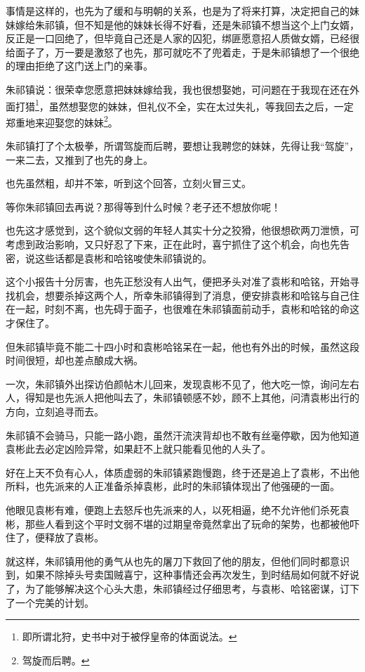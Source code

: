 \begin{multicols}{\theparacolNo}
事情是这样的，也先为了缓和与明朝的关系，也是为了将来打算，决定把自己的妹妹嫁给朱祁镇，但不知是他的妹妹长得不好看，还是朱祁镇不想当这个上门女婿，反正是一口回绝了，但毕竟自己还是人家的囚犯，绑匪愿意招人质做女婿，已经很给面子了，万一要是激怒了也先，那可就吃不了兜着走，于是朱祁镇想了一个很绝的理由拒绝了这门送上门的亲事。

朱祁镇说：很荣幸您愿意把妹妹嫁给我，我也很想娶她，可问题在于我现在还在外面打猎\footnote{即所谓北狩，史书中对于被俘皇帝的体面说法。}，虽然想娶您的妹妹，但礼仪不全，实在太过失礼，等我回去之后，一定郑重地来迎娶您的妹妹\footnote{驾旋而后聘。}。

朱祁镇打了个太极拳，所谓驾旋而后聘，要想让我聘您的妹妹，先得让我“驾旋”，一来二去，又推到了也先的身上。

也先虽然粗，却并不笨，听到这个回答，立刻火冒三丈。

等你朱祁镇回去再说？那得等到什么时候？老子还不想放你呢！

也先这才感觉到，这个貌似文弱的年轻人其实十分之狡猾，他很想砍两刀泄愤，可考虑到政治影响，又只好忍了下来，正在此时，喜宁抓住了这个机会，向也先告密，说这些话都是袁彬和哈铭唆使朱祁镇说的。

这个小报告十分厉害，也先正愁没有人出气，便把矛头对准了袁彬和哈铭，开始寻找机会，想要杀掉这两个人，所幸朱祁镇得到了消息，便安排袁彬和哈铭与自己住在一起，时刻不离，也先碍于面子，也很难在朱祁镇面前动手，袁彬和哈铭的命这才保住了。

但朱祁镇毕竟不能二十四小时和袁彬哈铭呆在一起，他也有外出的时候，虽然这段时间很短，却也差点酿成大祸。

一次，朱祁镇外出探访伯颜帖木儿回来，发现袁彬不见了，他大吃一惊，询问左右人，得知是也先派人把他叫去了，朱祁镇顿感不妙，顾不上其他，问清袁彬出行的方向，立刻追寻而去。

朱祁镇不会骑马，只能一路小跑，虽然汗流浃背却也不敢有丝毫停歇，因为他知道袁彬此去必定凶险异常，如果赶不上就只能看见他的人头了。

好在上天不负有心人，体质虚弱的朱祁镇紧跑慢跑，终于还是追上了袁彬，不出他所料，也先派来的人正准备杀掉袁彬，此时的朱祁镇体现出了他强硬的一面。

他眼见袁彬有难，便跑上去怒斥也先派来的人，以死相逼，绝不允许他们杀死袁彬，那些人看到这个平时文弱不堪的过期皇帝竟然拿出了玩命的架势，也都被他吓住了，便释放了袁彬。

就这样，朱祁镇用他的勇气从也先的屠刀下救回了他的朋友，但他们同时都意识到，如果不除掉头号卖国贼喜宁，这种事情还会再次发生，到时结局如何就不好说了，为了能够解决这个心头大患，朱祁镇经过仔细思考，与袁彬、哈铭密谋，订下了一个完美的计划。


\end{multicols}
